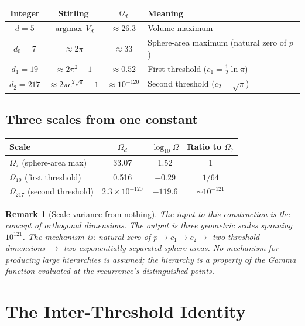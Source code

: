 \documentclass[11pt,a4paper]{article}
\newtheorem{remark}[theorem]{Remark}
\begin{document}
\begin{center}
\begin{tabular}{cccl}
\toprule
Integer & Stirling & $\Omega_d$ & Meaning\\
\midrule
$d=5$ & $\operatorname{argmax}\,V_d$ & $\approx 26.3$ & Volume maximum\\
$d_0 = 7$ & $\approx 2\pi$ & $\approx 33$ & Sphere-area maximum (natural zero of $p$)\\
$d_1 = 19$ & $\approx 2\pi^2-1$ & $\approx 0.52$ & First threshold ($c_1 = \tfrac{1}{2}\ln\pi$)\\
$d_2 = 217$ & $\approx 2\pi e^{2\sqrt{\pi}}-1$ & $\approx 10^{-120}$ & Second threshold ($c_2 = \sqrt{\pi}$)\\
\bottomrule
\end{tabular}
\end{center}

\subsection{Three scales from one constant}

\begin{center}
\begin{tabular}{lccc}
\toprule
Scale & $\Omega_d$ & $\log_{10}\Omega$ & Ratio to $\Omega_7$\\
\midrule
$\Omega_7$ (sphere-area max) & 33.07 & 1.52 & 1\\
$\Omega_{19}$ (first threshold) & 0.516 & $-0.29$ & $1/64$\\
$\Omega_{217}$ (second threshold) & $2.3\times 10^{-120}$ & $-119.6$ & $\sim 10^{-121}$\\
\bottomrule
\end{tabular}
\end{center}

\begin{remark}[Scale variance from nothing]
The input to this construction is the concept of orthogonal dimensions. The output is three geometric scales spanning $10^{121}$. The mechanism is: natural zero of $p\to c_1\to c_2\to$ two threshold dimensions $\to$ two exponentially separated sphere areas. No mechanism for producing large hierarchies is assumed; the hierarchy is a property of the Gamma function evaluated at the recurrence's distinguished points.
\end{remark}

\section{The Inter-Threshold Identity}
\end{document}
